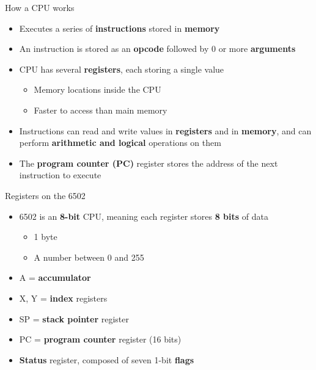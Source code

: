 \begin{frame}{How a CPU works}
	\begin{itemize}
		\pause\item Executes a series of \textbf{instructions} stored in \textbf{memory}
		\pause\item An instruction is stored as an \textbf{opcode} followed by 0 or more \textbf{arguments}
		\pause\item CPU has several \textbf{registers}, each storing a single value
			\begin{itemize}
				\pause\item Memory locations inside the CPU
				\pause\item Faster to access than main memory
			\end{itemize}
		\pause\item Instructions can read and write values in \textbf{registers} and in \textbf{memory},
			and can perform \textbf{arithmetic and logical} operations on them
		\pause\item The \textbf{program counter (PC)} register stores the address of the next instruction to execute
	\end{itemize}
\end{frame}

\begin{frame}{Registers on the 6502}
	\begin{itemize}
		\pause\item 6502 is an \textbf{8-bit} CPU, meaning each register stores \textbf{8 bits} of data
			\begin{itemize}
				\pause\item 1 byte
				\pause\item A number between 0 and 255
			\end{itemize}
		\pause\item A = \textbf{accumulator}
		\pause\item X, Y = \textbf{index} registers
		\pause\item SP = \textbf{stack pointer} register
		\pause\item PC = \textbf{program counter} register (16 bits)
		\pause\item \textbf{Status} register, composed of seven 1-bit \textbf{flags}
	\end{itemize}
\end{frame}

